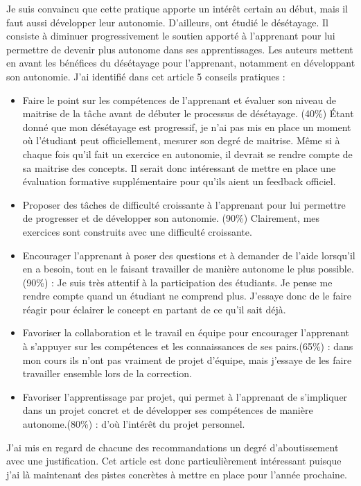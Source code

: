 Je suis convaincu que cette pratique apporte un intérêt certain au début, mais il faut aussi développer leur autonomie. D'ailleurs, \citet{auger2010desetayage} ont étudié le désétayage. Il consiste à diminuer progressivement le soutien apporté à l'apprenant pour lui permettre de devenir plus autonome dans ses apprentissages. Les auteurs mettent en avant les bénéfices du désétayage pour l'apprenant, notamment en développant son autonomie. J'ai identifié dans cet article 5 conseils pratiques :

\begin{itemize}
    \item Faire le point sur les compétences de l'apprenant et évaluer son niveau de maitrise de la tâche avant de débuter le processus de désétayage. (40\%) Étant donné que mon désétayage est progressif, je n'ai pas mis en place un moment où l'étudiant peut officiellement, mesurer son degré de maitrise. Même si à chaque fois qu'il fait un exercice en autonomie, il devrait se rendre compte de sa maitrise des concepts. Il serait donc intéressant de mettre en place une évaluation formative supplémentaire pour qu'ils aient un feedback officiel.
    \item Proposer des tâches de difficulté croissante à l'apprenant pour lui permettre de progresser et de développer son autonomie. (90\%) Clairement, mes exercices sont construits avec une difficulté croissante.
    \item Encourager l'apprenant à poser des questions et à demander de l'aide lorsqu'il en a besoin, tout en le faisant travailler de manière autonome le plus possible.(90\%) : Je suis très attentif à la participation des étudiants. Je pense me rendre compte quand un étudiant ne comprend plus. J'essaye donc de le faire réagir pour éclairer le concept en partant de ce qu'il sait déjà.
    \item Favoriser la collaboration et le travail en équipe pour encourager l'apprenant à s'appuyer sur les compétences et les connaissances de ses pairs.(65\%) : dans mon cours ils n'ont pas vraiment de projet d'équipe, mais j'essaye de les faire travailler ensemble lors de la correction.
    \item Favoriser l'apprentissage par projet, qui permet à l'apprenant de s'impliquer dans un projet concret et de développer ses compétences de manière autonome.(80\%) : d'où l'intérêt du projet personnel.
\end{itemize}

J'ai mis en regard de chacune des recommandations un degré d'aboutissement avec une justification. Cet article est donc particulièrement intéressant puisque j'ai là maintenant des pistes concrètes à mettre en place pour l'année prochaine.\\

